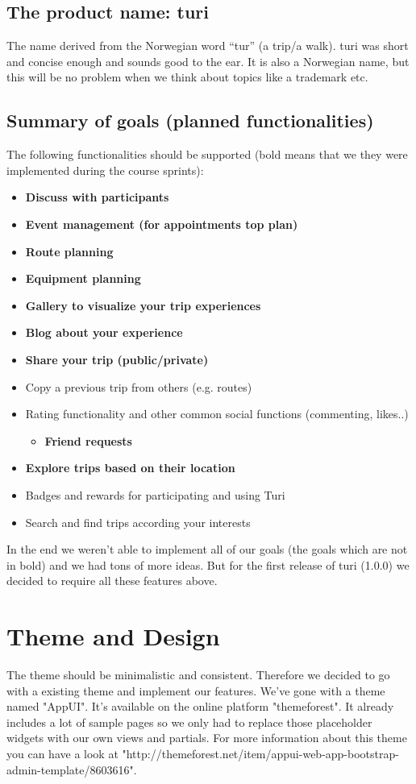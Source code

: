 \documentclass[a4paper]{article}
\begin{document}
\subsection{The product name: turi}
The name derived from the Norwegian word “tur” (a trip/a walk). turi was short and concise enough and sounds good to the ear. It is also a Norwegian name, but this will be no problem when we think about topics like a trademark etc.

\subsection{Summary of goals (planned functionalities)}
The following functionalities should be supported (bold means that we they were implemented during the course sprints):
\begin{itemize}
  \item {\textbf{Discuss with participants}}
  \item {\textbf{Event management (for appointments top plan)}}
  \item {\textbf{Route planning}}
  \item {\textbf{Equipment planning}}
  \item {\textbf{Gallery to visualize your trip experiences}}
  \item {\textbf{Blog about your experience}}
  \item {\textbf{Share your trip (public/private)}}
  \item {Copy a previous trip from others (e.g. routes)}
  \item {Rating functionality and other common social functions (commenting, likes..)
  \begin{itemize}
    \item {\textbf{Friend requests}}
  \end{itemize}}
  \item {\textbf{Explore trips based on their location}}
  \item {Badges and rewards for participating and using Turi}
  \item {Search and find trips according your interests}
\end{itemize}

\noindent
In the end we weren't able to implement all of our goals (the goals which are not in bold) and we had tons of more ideas. But for the first release of turi (1.0.0) we decided to require all these features above.\\

\section{Theme and Design}
The theme should be minimalistic and consistent. Therefore we decided to go with a existing theme and implement our features. We've gone with a theme named "AppUI". It's available on the online platform "themeforest". It already includes a lot of sample pages so we only had to replace those placeholder widgets with our own views and partials. For more information about this theme you can have a look at "http://themeforest.net/item/appui-web-app-bootstrap-admin-template/8603616".
\end{document}
